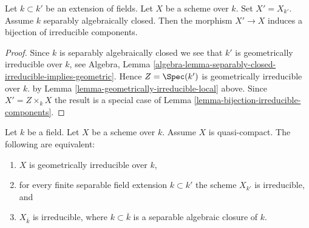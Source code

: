 \begin{lemma}
\label{lemma-separably-closed-field-irreducible-components}
Let $k \subset k'$ be an extension of fields.
Let $X$ be a scheme over $k$. Set $X' = X_{k'}$.
Assume $k$ separably algebraically closed.
Then the morphism $X' \to X$ induces a bijection of irreducible components.
\end{lemma}

\begin{proof}
Since $k$ is separably algebraically closed we see that
$k'$ is geometrically irreducible over $k$, see Algebra,
Lemma \ref{algebra-lemma-separably-closed-irreducible-implies-geometric}.
Hence $Z = \Spec(k')$ is geometrically irreducible over $k$.
by Lemma \ref{lemma-geometrically-irreducible-local} above.
Since $X' = Z \times_k X$ the result is a special case
of Lemma \ref{lemma-bijection-irreducible-components}.
\end{proof}

\begin{lemma}
\label{lemma-characterize-geometrically-irreducible}
Let $k$ be a field. Let $X$ be a scheme over $k$.
Assume $X$ is quasi-compact. The following are equivalent:
\begin{enumerate}
\item $X$ is geometrically irreducible over $k$,
\item for every finite separable field extension $k \subset k'$
the scheme $X_{k'}$ is irreducible, and
\item $X_{\overline{k}}$ is irreducible, where $k \subset \overline{k}$
is a separable algebraic closure of $k$.
\end{enumerate}
\end{lemma}

